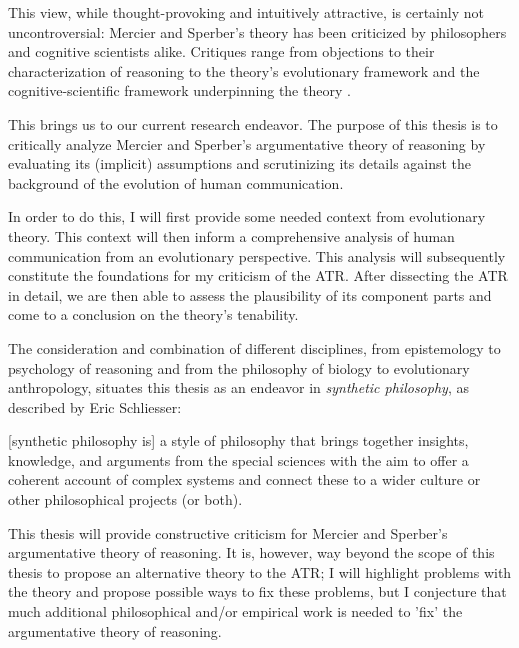 This view, while thought-provoking and intuitively attractive, is certainly not uncontroversial: Mercier and Sperber's theory has been criticized by philosophers and cognitive scientists alike. Critiques range from objections to their characterization of reasoning \citep{Koren23} to the theory's evolutionary framework \citep{Novaes18} and the cognitive-scientific framework underpinning the theory \citep{Sterelny18, Chater18}.


This brings us to our current research endeavor.
The purpose of this thesis is to critically analyze Mercier and Sperber's argumentative theory of reasoning by evaluating its (implicit) assumptions and scrutinizing its details against the background of the evolution of human communication.

In order to do this, I will first provide some needed context from evolutionary theory. This context will then inform a comprehensive analysis of human communication from an evolutionary perspective. This analysis will subsequently constitute the foundations for my criticism of the ATR.
After dissecting the ATR in detail, we are then able to assess the plausibility of its component parts and come to a conclusion on the theory's tenability.

The consideration and combination of different disciplines, from epistemology to psychology of reasoning and from the philosophy of biology to evolutionary anthropology,
situates this thesis as an endeavor in \emph{synthetic philosophy}, as described by Eric Schliesser:
\begin{quoting}
    {[synthetic philosophy is]} a style of philosophy that brings together insights, knowledge, and arguments from the special sciences with the aim to offer a coherent account of complex systems and connect these to a wider culture or other philosophical projects (or both).
\end{quoting}

This thesis will provide constructive criticism for Mercier and Sperber's argumentative theory of reasoning. It is, however, way beyond the scope of this thesis to propose an alternative theory to the ATR; I will highlight problems with the theory and propose possible ways to fix these problems, but I conjecture that much additional philosophical and/or empirical work is needed to 'fix' the argumentative theory of reasoning.


